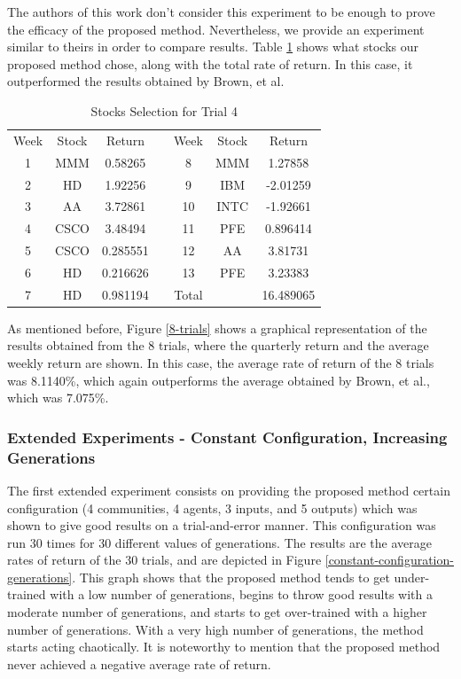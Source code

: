 \documentclass[a4paper,twoside]{article}
\begin{document}
The authors of this work don't consider this experiment to be enough to prove the efficacy of the proposed method. Nevertheless, we provide an experiment similar to theirs in order to compare results. Table \ref{best-trial-table} shows what stocks our proposed method chose, along with the total rate of return. In this case, it outperformed the results obtained by Brown, et al.
    
\begin{table}
    \caption{{Stocks Selection for Trial 4}} 
    \label{best-trial-table}
    \begin{tabular}{ c c c c c c c }
        Week & Stock & Return &  & Week & Stock & Return \\ 
        1 & MMM & 0.58265 &  & 8 & MMM & 1.27858 \\ 
        2 & HD & 1.92256 &  & 9 & IBM & -2.01259 \\ 
        3 & AA & 3.72861 &  & 10 & INTC & -1.92661 \\ 
        4 & CSCO & 3.48494 &  & 11 & PFE & 0.896414 \\ 
        5 & CSCO & 0.285551 &  & 12 & AA & 3.81731 \\ 
        6 & HD & 0.216626 &  & 13 & PFE & 3.23383 \\ 
        7 & HD & 0.981194 &  & Total &  & 16.489065 \\ 
    \end{tabular}
\end{table}

As mentioned before, Figure \ref{8-trials} shows a graphical representation of the results obtained from the 8 trials, where the quarterly return and the average weekly return are shown. In this case, the average rate of return of the 8 trials was 8.1140\%, which again outperforms the average obtained by Brown, et al., which was 7.075\%.

\subsubsection{Extended Experiments - Constant Configuration, Increasing Generations}

The first extended experiment consists on providing the proposed method certain configuration (4 communities, 4 agents, 3 inputs, and 5 outputs) which was shown to give good results on a trial-and-error manner. This configuration was run 30 times for 30 different values of generations. The results are the average rates of return of the 30 trials, and are depicted in Figure \ref{constant-configuration-generations}. This graph shows that the proposed method tends to get under-trained with a low number of generations, begins to throw good results with a moderate number of generations, and starts to get over-trained with a higher number of generations. With a very high number of generations, the method starts acting chaotically. It is noteworthy to mention that the proposed method never achieved a negative average rate of return.
\end{document}
